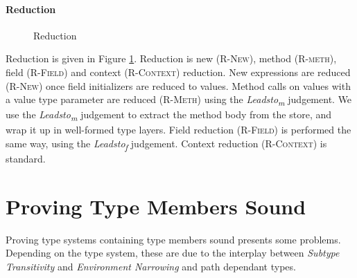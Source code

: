 \documentclass[11pt
              , a4paper
              , twoside
              , openright
              ]{report}
\numberwithin{case}{theorem}
\numberwithin{subcase}{case}
\begin{document}
\subsubsection{Reduction}
\begin{figure}[h]
\hfill {}
\caption{Reduction}
\label{f:red}
\end{figure}
Reduction is given in Figure \ref{f:red}. Reduction is new (\textsc{R-New}), method (\textsc{R-meth}), field (\textsc{R-Field}) and context (\textsc{R-Context}) reduction. New expressions are reduced (\textsc{R-New}) once field initializers are reduced to values. Method calls on values with a value type parameter are reduced (\textsc{R-Meth}) using the \emph{Leadsto\textsubscript{m}} judgement. We use the \emph{Leadsto\textsubscript{m}} judgement to extract the method body from the store, and wrap it up in well-formed type layers. Field reduction (\textsc{R-Field}) is performed the same way, using the \emph{Leadsto\textsubscript{f}} judgement. Context reduction (\textsc{R-Context}) is standard.



\chapter{Proving Type Members Sound}\label{ch:proof}
Proving type systems containing type members sound presents some problems. Depending on the type system, these are due to the interplay between \emph{Subtype Transitivity} and \emph{Environment Narrowing} and path dependant types.
\end{document}
